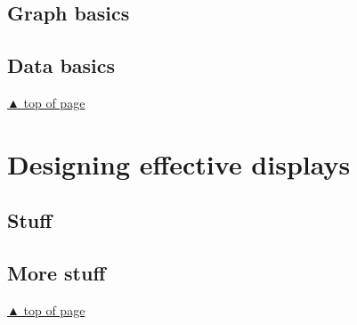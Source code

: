 \documentclass[
]{book}
\begin{document}
\hypertarget{graph-basics}{%
\section{Graph basics}\label{graph-basics}}

\hypertarget{data-basics}{%
\section{Data basics}\label{data-basics}}

\protect\hyperlink{start-with-R}{▲ top of page}

\hypertarget{display-design}{%
\chapter{Designing effective displays}\label{display-design}}

\hypertarget{stuff-2}{%
\section{Stuff}\label{stuff-2}}

\hypertarget{more-stuff-2}{%
\section{More stuff}\label{more-stuff-2}}

\protect\hyperlink{display-design}{▲ top of page}

  
\end{document}

